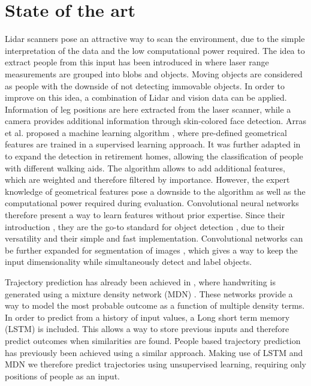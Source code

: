 \section{State of the art}

Lidar scanners pose an attractive way to scan the environment, due to the simple interpretation of the data and the low computational power required.
The idea to extract people from this input has been introduced in \cite{1013691} where laser range measurements are grouped into blobs and objects. 
Moving objects are considered as people with the downside of not detecting immovable objects.
In order to improve on this idea, a combination of Lidar and vision data \cite{kleinehagenbrock2002person} can be applied. Information of leg positions are here extracted from the laser scanner, while a camera provides additional information through skin-colored face detection. 
Arras et al. proposed a machine learning algorithm \cite{Arras07usingboosted}, where pre-defined geometrical features are trained in a supervised learning approach. 
It was further adapted in \cite{weinrich2014people} to expand the detection in retirement homes, allowing the classification of people with different walking aids. 
The algorithm allows to add additional features, which are weighted and therefore filtered by importance.
However, the expert knowledge of geometrical features pose a downside to the algorithm as well as the computational power required during evaluation. Convolutional neural networks therefore present a way to learn features without prior expertise. Since their introduction \cite{lecun_gradient-based_1998}, they are the go-to standard for object detection \cite{krizhevsky_imagenet_2012}, due to their versatility and their simple and fast implementation. Convolutional networks can be further expanded for segmentation of images \cite{long2015fully}, which gives a way to keep the input dimensionality while simultaneously detect and label objects.

Trajectory prediction has already been achieved in \cite{graves2013generating}, where handwriting is generated using a mixture density network (MDN) \cite{bishop1994mixture}. These networks provide a way to model the most probable outcome as a function of multiple density terms. In order to predict from a history of input values, a Long short term memory (LSTM) \cite{hochreiter1997long} is included. This allows a way to store previous inputs and therefore predict outcomes when similarities are found. People based trajectory prediction has previously been achieved \cite{alahi2016social} using a similar approach. Making use of LSTM and MDN we therefore predict trajectories using unsupervised learning, requiring only positions of people as an input.
